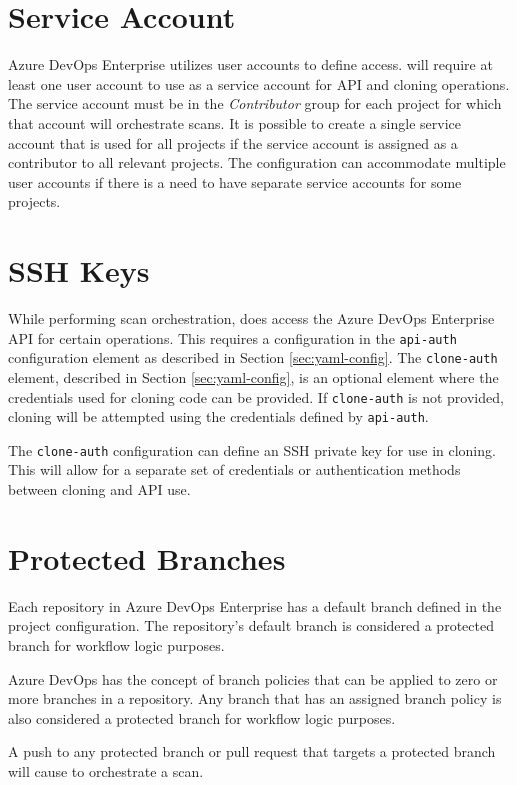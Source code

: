 \section{\cxoneflowtext\space Service Account}

Azure DevOps Enterprise utilizes user accounts to define access.  \cxoneflow will require
at least one user account to use as a service account for API and cloning operations.  The
service account must be in the \textit{Contributor} group for each project for which
that account will orchestrate scans.  It is possible to create a single service account that
is used for all projects if the service account is assigned as a contributor to all
relevant projects.  The \cxoneflow configuration can accommodate multiple user accounts
if there is a need to have separate service accounts for some projects.

\section{\cxoneflowtext\space SSH Keys}

While performing scan orchestration, \cxoneflow does access the Azure DevOps Enterprise API for
certain operations.  This requires a configuration in the \texttt{api-auth} configuration
element as described in Section \ref{sec:yaml-config}.  The \texttt{clone-auth} element,
described in Section \ref{sec:yaml-config}, is an optional element where the credentials
used for cloning code can be provided.  If \texttt{clone-auth} is not provided, cloning will
be attempted using the credentials defined by \texttt{api-auth}.

The \texttt{clone-auth} configuration can define an SSH private key for use in cloning.  This
will allow for a separate set of credentials or authentication methods between cloning and
API use.

\section{Protected Branches}

Each repository in Azure DevOps Enterprise has a default branch defined in the project
configuration.  The repository's default branch is considered a protected branch for
workflow logic purposes.

Azure DevOps has the concept of branch policies that can be applied to zero or more
branches in a repository.  Any branch that has an assigned branch policy is also considered
a protected branch for workflow logic purposes.

A push to any protected branch or pull request that targets a protected branch will cause \cxoneflow to
orchestrate a scan.
